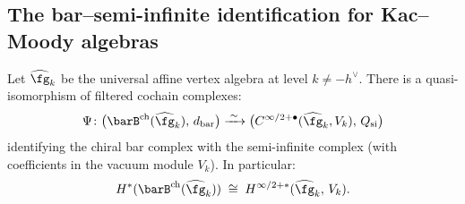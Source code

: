 \subsection{The bar--semi-infinite identification for Kac--Moody algebras}

\begin{theorem}[Bar complex = semi-infinite complex for KM;
\ClaimStatusConditional]
\label{thm:bar-semi-infinite-km}
Let $\widehat{\fg}_k$ be the universal affine vertex algebra at level
$k \neq -h^\vee$. There is a quasi-isomorphism of filtered cochain
complexes:
\begin{equation}\label{eq:bar-semi-infinite}
\Psi \colon
 \bigl(\barB^{\mathrm{ch}}(\widehat{\fg}_k),\, d_{\mathrm{bar}}\bigr)
 \xrightarrow{\;\sim\;}
 \bigl(C^{\infty/2+\bullet}(\widehat{\fg}_k, V_k),\, Q_{\mathrm{si}}\bigr)
\end{equation}
identifying the chiral bar complex with the semi-infinite complex
\textup{(}with coefficients in the vacuum module $V_k$\textup{)}.
In particular:
\begin{equation}\label{eq:bar-equals-semi-infinite}
H^*(\barB^{\mathrm{ch}}(\widehat{\fg}_k))
\;\cong\;
H^{\infty/2+*}(\widehat{\fg}_k,\, V_k).
\end{equation}
\end{theorem}

